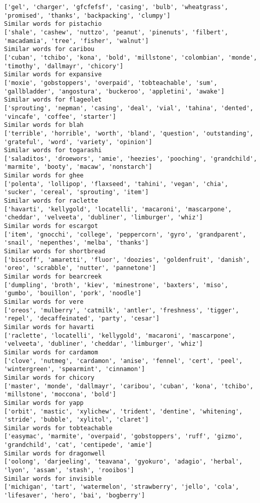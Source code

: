 \documentclass[11pt]{article}
\begin{document}
\begin{Verbatim}[commandchars=\\\{\}]
['gel', 'charger', 'gfcfefsf', 'casing', 'bulb', 'wheatgrass', 'promised', 'thanks', 'backpacking', 'clumpy']
Similar words for pistachio
['shale', 'cashew', 'nuttzo', 'peanut', 'pinenuts', 'filbert', 'macadamia', 'tree', 'fisher', 'walnut']
Similar words for caribou
['cuban', 'tchibo', 'kona', 'bold', 'millstone', 'colombian', 'monde', 'timothy', 'dallmayr', 'chicory']
Similar words for expansive
['moxie', 'gobstoppers', 'overpaid', 'tobteachable', 'sum', 'gallbladder', 'angostura', 'buckeroo', 'appletini', 'awake']
Similar words for flageolet
['sprouting', 'nepman', 'casing', 'deal', 'vial', 'tahina', 'dented', 'vincafe', 'coffee', 'starter']
Similar words for blah
['terrible', 'horrible', 'worth', 'bland', 'question', 'outstanding', 'grateful', 'word', 'variety', 'opinion']
Similar words for togarashi
['saladitos', 'droewors', 'amie', 'heezies', 'pooching', 'grandchild', 'marmite', 'booty', 'macaw', 'nonstarch']
Similar words for ghee
['polenta', 'lollipop', 'flaxseed', 'tahini', 'vegan', 'chia', 'sucker', 'cereal', 'sprouting', 'item']
Similar words for raclette
['havarti', 'kellygold', 'locatelli', 'macaroni', 'mascarpone', 'cheddar', 'velveeta', 'dubliner', 'limburger', 'whiz']
Similar words for escargot
['item', 'gnocchi', 'college', 'peppercorn', 'gyro', 'grandparent', 'snail', 'nepenthes', 'melba', 'thanks']
Similar words for shortbread
['biscoff', 'amaretti', 'fluor', 'doozies', 'goldenfruit', 'danish', 'oreo', 'scrabble', 'nutter', 'pannetone']
Similar words for bearcreek
['dumpling', 'broth', 'kiev', 'minestrone', 'baxters', 'miso', 'gumbo', 'bouillon', 'pork', 'noodle']
Similar words for vere
['oreos', 'mulberry', 'catmilk', 'antler', 'freshness', 'tigger', 'repel', 'decaffeinated', 'party', 'cesar']
Similar words for havarti
['raclette', 'locatelli', 'kellygold', 'macaroni', 'mascarpone', 'velveeta', 'dubliner', 'cheddar', 'limburger', 'whiz']
Similar words for cardamom
['clove', 'nutmeg', 'cardamon', 'anise', 'fennel', 'cert', 'peel', 'wintergreen', 'spearmint', 'cinnamon']
Similar words for chicory
['master', 'monde', 'dallmayr', 'caribou', 'cuban', 'kona', 'tchibo', 'millstone', 'moccona', 'bold']
Similar words for yapp
['orbit', 'mastic', 'xylichew', 'trident', 'dentine', 'whitening', 'stride', 'bubble', 'xylitol', 'claret']
Similar words for tobteachable
['easymac', 'marmite', 'overpaid', 'gobstoppers', 'ruff', 'gizmo', 'grandchild', 'cat', 'centipede', 'amie']
Similar words for dragonwell
['oolong', 'darjeeling', 'teavana', 'gyokuro', 'adagio', 'herbal', 'lyon', 'assam', 'stash', 'rooibos']
Similar words for invisible
['michigan', 'tart', 'watermelon', 'strawberry', 'jello', 'cola', 'lifesaver', 'hero', 'bai', 'bogberry']

\end{Verbatim}
\end{document}
